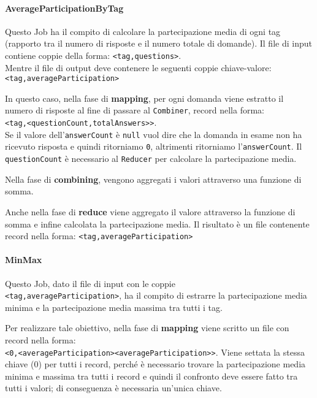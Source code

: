 \documentclass[10pt]{article}
\begin{document}
\paragraph{AverageParticipationByTag}
Questo Job ha il compito di calcolare la partecipazione media di ogni tag (rapporto 
tra il numero di risposte e il numero totale di domande).
Il file di input contiene coppie della forma: \texttt{<tag,questions>}.\\
Mentre il file di output deve contenere le seguenti coppie chiave-valore:\\
\texttt{<tag,averageParticipation>}

In questo caso, nella fase di \textbf{mapping}, per ogni domanda viene estratto il numero di risposte al fine di passare al \texttt{Combiner}, record nella forma: \\
\texttt{<tag,<questionCount,totalAnswers>>}.\\
Se il valore dell'\texttt{answerCount} è \texttt{null} vuol dire che la domanda in esame non ha ricevuto risposta e quindi ritorniamo \texttt{0}, altrimenti ritorniamo l'\texttt{answerCount}.
Il \texttt{questionCount} è necessario al \texttt{Reducer} per calcolare la partecipazione media.

Nella fase di \textbf{combining}, vengono aggregati i valori attraverso una funzione di somma.

Anche nella fase di \textbf{reduce} viene aggregato il valore attraverso la funzione di somma e infine calcolata la partecipazione media. Il risultato è un file contenente record nella forma: \texttt{<tag,averageParticipation>}

\paragraph{MinMax}
Questo Job, dato il file di input con le coppie\\
\texttt{<tag,averageParticipation>}, ha il compito di estrarre la partecipazione media minima e la partecipazione media massima tra tutti i tag.

Per realizzare tale obiettivo, nella fase di \textbf{mapping} viene scritto un file con record nella forma:\\ \texttt{<0,<averageParticipation><averageParticipation>>}.
Viene settata la stessa chiave (0) per tutti i record, perché è necessario trovare la partecipazione media minima e massima tra tutti i record e quindi il confronto deve essere fatto tra tutti i valori; di conseguenza è necessaria un'unica chiave.
\end{document}
